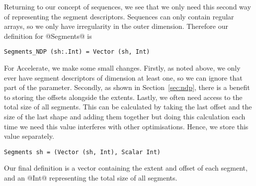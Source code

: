Returning to our concept of sequences, we see that we only need this second way of representing the segment descriptors. Sequences can only contain regular arrays, so we only have irregularity in the outer dimension. Therefore our definition for @Segments@ is
%
\begin{lstlisting}[style=ndp]
Segments_NDP (sh:.Int) = Vector (sh, Int)
\end{lstlisting}
%
For Accelerate, we make some small changes. Firstly, as noted above, we only ever have segment descriptors of dimension at least one, so we can ignore that part of the parameter. Secondly, as shown in Section~\ref{sec:ndp}, there is a benefit to storing the offsets alongside the extents. Lastly, we often need access to the total size of all segments. This can be calculated by taking the last offset and the size of the last shape and adding them together but doing this calculation each time we need this value interferes with other optimisations. Hence, we store this value separately.
%
\begin{lstlisting}[style=ndp]
Segments sh = (Vector (sh, Int), Scalar Int)
\end{lstlisting}
%
Our final definition is a vector containing the extent and offset of each segment, and an @Int@ representing the total size of all segments.




%
%

